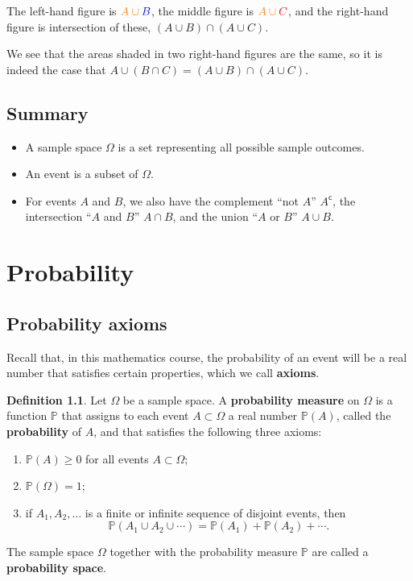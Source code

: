 \documentclass[
  a4paper,
]{book}
\providecommand{\tightlist}{%
  \setlength{\itemsep}{0pt}\setlength{\parskip}{0pt}}
\theoremstyle{definition}
\newtheorem{definition}{Definition}[chapter]
\theoremstyle{definition}
\theoremstyle{definition}
\theoremstyle{definition}
\theoremstyle{remark}
\begin{document}
The left-hand figure is \(\color{orange}{A} \cup \color{blue}{B}\), the middle figure is \(\color{orange}{A}\cup \color{red}{C}\), and the right-hand figure is intersection of these, \((A\cup B)\cap (A\cup C)\).

We see that the areas shaded in two right-hand figures are the same, so it is indeed the case that
\(A\cup (B\cap C) = (A\cup B)\cap (A\cup C)\).

\hypertarget{summary-L03}{%
\section*{Summary}\label{summary-L03}}

\begin{itemize}
\tightlist
\item
  A sample space \(\Omega\) is a set representing all possible sample outcomes.
\item
  An event is a subset of \(\Omega\).
\item
  For events \(A\) and \(B\), we also have the complement ``not \(A\)'' \(A^\mathsf{c}\), the intersection ``\(A\) and \(B\)'' \(A \cap B\), and the union ``\(A\) or \(B\)'' \(A \cup B\).
\end{itemize}

\hypertarget{L04-probability}{%
\chapter{Probability}\label{L04-probability}}

\hypertarget{axioms}{%
\section{Probability axioms}\label{axioms}}

Recall that, in this mathematics course, the probability of an event will be a real number that satisfies certain properties, which we call \textbf{axioms}.

\begin{definition}
\protect\hypertarget{def:axioms}{}\label{def:axioms}Let \(\Omega\) be a sample space. A \textbf{probability measure} on \(\Omega\) is a function \(\mathbb P\) that assigns to each event \(A \subset \Omega\) a real number \(\mathbb P(A)\), called the \textbf{probability} of \(A\), and that satisfies the following three axioms:

\begin{enumerate}
\def\labelenumi{\arabic{enumi}.}
\tightlist
\item
  \(\mathbb P(A) \geq 0\) for all events \(A \subset \Omega\);
\item
  \(\mathbb P(\Omega) = 1\);
\item
  if \(A_1, A_2, \dots\) is a finite or infinite sequence of disjoint events, then
  \[ \mathbb P(A_1 \cup A_2 \cup \cdots) = \mathbb P(A_1) + \mathbb P(A_2) + \cdots . \]
\end{enumerate}

The sample space \(\Omega\) together with the probability measure \(\mathbb P\) are called a \textbf{probability space}.
\end{definition}
\end{document}
